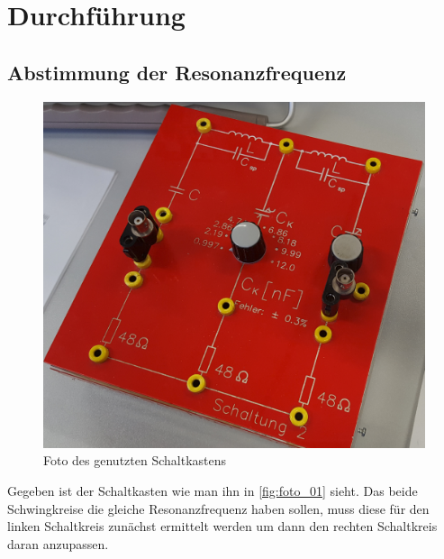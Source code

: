 \section{Durchführung}
\label{sec:Durchführung}


\subsection{Abstimmung der Resonanzfrequenz}

\begin{figure}
    \centering
    \includegraphics[width=\textwidth/2]{images/foto_01.png}
    \caption{Foto des genutzten Schaltkastens}
    \label{fig:foto_01}
\end{figure}

Gegeben ist der Schaltkasten wie man ihn in \autoref{fig:foto_01} sieht.
Das beide Schwingkreise die gleiche Resonanzfrequenz haben sollen, muss diese für den linken Schaltkreis zunächst ermittelt werden um dann den rechten Schaltkreis daran anzupassen.

